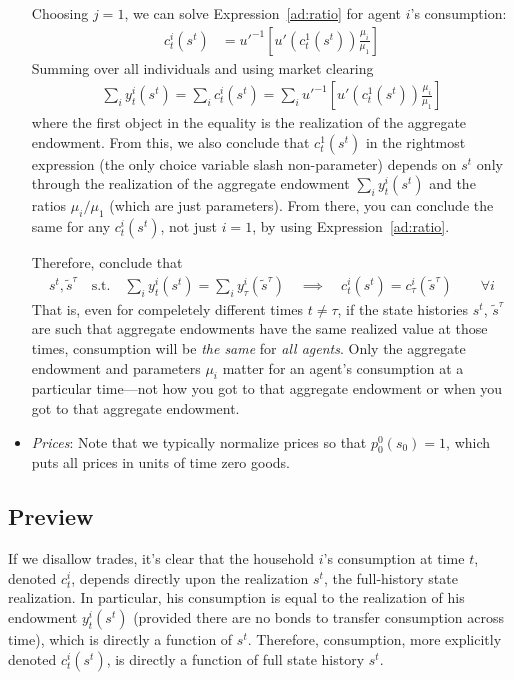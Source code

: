 \documentclass[12pt]{article}
\theoremstyle{plain}
\theoremstyle{definition}
\theoremstyle{remark}
\begin{document}
\begin{itemize}
    Choosing $j=1$, we can solve Expression~\ref{ad:ratio} for agent
    $i$'s consumption:
    \begin{align}
      c_t^i(s^t)
      &=
      u'^{-1}
      \left[
      u'\left(c_t^1(s^t)\right)
      \frac{\mu_i}{\mu_1}
      \right]
    \end{align}
    Summing over all individuals and using market clearing
    \begin{align*}
      \sum_i y_t^i(s^t)
      =
      \sum_i c_t^i(s^t)
      =
      \sum_i
      u'^{-1}
      \left[
      u'\left(c_t^1(s^t)\right)
      \frac{\mu_i}{\mu_1}
      \right]
    \end{align*}
    where the first object in the equality is the realization of the
    aggregate endowment. From this, we also conclude that $c^1_t(s^t)$
    in the rightmost expression (the only choice variable slash
    non-parameter) depends on $s^t$ only through the realization of the
    aggregate endowment $\sum_i y_t^i(s^t)$ and the ratios $\mu_i/\mu_1$
    (which are just parameters). From there, you can conclude the same
    for any $c^i_t(s^t)$, not just $i=1$, by using
    Expression~\ref{ad:ratio}.

    Therefore, conclude that
    \begin{align*}
      s^t, \tilde{s}^\tau
      \quad\text{s.t.}\quad
      \sum_i y_t^i(s^t)
      = \sum_i y_\tau^i(\tilde{s}^\tau)
      \quad\implies\quad
      c_t^i(s^t) = c_\tau^i(\tilde{s}^\tau)
      \qquad \forall i
    \end{align*}
    That is, even for compeletely different times $t\neq \tau$, if the
    state histories $s^t$, $\tilde{s}^\tau$ are such that aggregate
    endowments have the same realized value at those times, consumption
    will be \emph{the same} for \emph{all agents}.  Only the aggregate
    endowment and parameters $\mu_i$ matter for an agent's consumption
    at a particular time---not how you got to that aggregate endowment
    or when you got to that aggregate endowment.

  \item \emph{Prices}:
    Note that we typically normalize prices so that $p_0^0(s_0)=1$,
    which puts all prices in units of time zero goods.
\end{itemize}

\subsection{Preview}

If we disallow trades, it's clear that the household $i$'s consumption
at time $t$, denoted $c_t^i$, depends directly upon the realization
$s^t$, the full-history state realization. In particular, his
consumption is equal to the realization of his endowment $y^i_t(s^t)$
(provided there are no bonds to transfer consumption across time), which
is directly a function of $s^t$.  Therefore, consumption, more
explicitly denoted $c_t^i(s^t)$, is directly a function of full state
history $s^t$.
\end{document}
